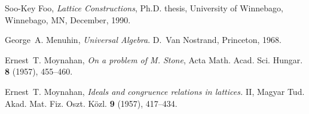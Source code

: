 \documentclass{amsart}
\begin{document}
\begin{thebibliography}{9}
      Soo-Key Foo, 
      \emph{Lattice Constructions}, 
      Ph.D. thesis, 
      University of Winnebago, Winnebago, MN, December, 1990.
      
      George~A. Menuhin, 
      \emph{Universal Algebra}.
      D.~Van Nostrand, Princeton, 1968.
      
      Ernest~T. Moynahan, 
      \emph{On a problem of M. Stone},
      Acta Math. Acad. Sci. Hungar. \textbf{8} (1957), 455--460.
      
      Ernest~T. Moynahan, 
      \emph{Ideals and congruence relations in lattices.} II,
      Magyar Tud. Akad. Mat. Fiz. Oszt. K\"{o}zl. \textbf{9} 
      (1957), 417--434.
\end{thebibliography}

\printindex
\end{document}
